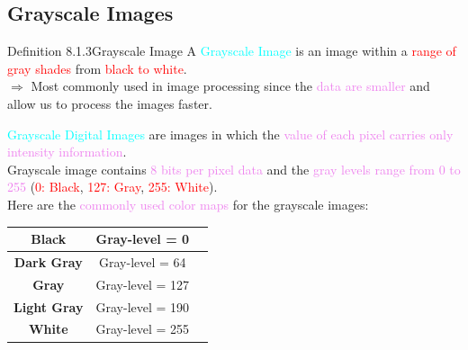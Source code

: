 \documentclass{book}
\begin{document}
\subsection{Grayscale Images}
\begin{defBox}{Definition 8.1.3}{Grayscale Image}
    A \textcolor{cyan}{Grayscale Image} is an image within a \textcolor{red}{range of gray shades} from \textcolor{red}{black to white}.\\
    $\Rightarrow$ Most commonly used in image processing since the \textcolor{violet}{data are smaller} and allow us to process the images faster.
\end{defBox}
\textcolor{cyan}{Grayscale Digital Images} are images in which the \textcolor{violet}{value of each pixel carries only intensity information}.\\
Grayscale image contains \textcolor{violet}{8 bits per pixel data} and the \textcolor{violet}{gray levels range from 0 to 255} (\textcolor{red}{0: Black}, \textcolor{red}{127: Gray}, \textcolor{red}{255: White}).\\
Here are the \textcolor{violet}{commonly used color maps} for the grayscale images:
\begin{center}
    \begin{tabular}{|c|c|c|}
        \hline
        \textbf{Black} & Gray-level = 0 & \cellcolor{black} \\
        \hline
        \textbf{Dark Gray} & Gray-level = 64 & \cellcolor[gray]{0.25} \\
        \hline
        \textbf{Gray} & Gray-level = 127 & \cellcolor[gray]{0.5} \\
        \hline
        \textbf{Light Gray} & Gray-level = 190 & \cellcolor[gray]{0.75} \\
        \hline
        \textbf{White} & Gray-level = 255 & \cellcolor{white} \\
        \hline
    \end{tabular}
\end{center}
\newpage
\end{document}
